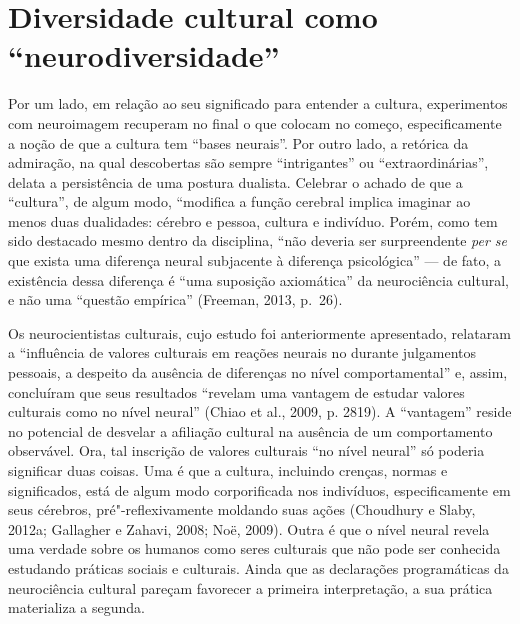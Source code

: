 \chapter{Diversidade cultural como ``neurodiversidade''}

Por um lado, em relação ao seu significado para entender a cultura,
experimentos com neuroimagem recuperam no final o que colocam no começo,
especificamente a noção de que a cultura tem ``bases neurais''. Por
outro lado, a retórica da admiração, na qual descobertas são sempre
``intrigantes'' ou ``extraordinárias'', delata a persistência de uma
postura dualista. Celebrar o achado de que a ``cultura'', de algum modo,
``modifica a função cerebral implica imaginar ao menos duas dualidades:
cérebro e pessoa, cultura e indivíduo. Porém, como tem sido destacado
mesmo dentro da disciplina, ``não deveria ser surpreendente \emph{per
se} que exista uma diferença neural subjacente à diferença psicológica''
--- de fato, a existência dessa diferença é ``uma suposição axiomática''
da neurociência cultural, e não uma ``questão empírica'' (Freeman, 2013,
p.~26).

Os neurocientistas culturais, cujo estudo foi anteriormente apresentado,
relataram a ``influência de valores culturais em reações neurais no 
durante julgamentos pessoais, a despeito da ausência de diferenças no
nível comportamental'' e, assim, concluíram que seus resultados
``revelam uma vantagem de estudar valores culturais como  no nível
neural'' (Chiao et al., 2009, p. 2819). A ``vantagem'' reside no
potencial de desvelar a afiliação cultural na ausência de um
comportamento observável. Ora, tal inscrição de valores culturais ``no
nível neural'' só poderia significar duas coisas. Uma é que a cultura,
incluindo crenças, normas e significados, está de algum modo
corporificada nos indivíduos, especificamente em seus cérebros,
pré"-reflexivamente moldando suas ações (Choudhury e Slaby, 2012a;
Gallagher e Zahavi, 2008; Noë, 2009). Outra é que o nível neural revela
uma verdade sobre os humanos como seres culturais que não pode ser
conhecida estudando práticas sociais e culturais. Ainda que as
declarações programáticas da neurociência cultural pareçam favorecer a
primeira interpretação, a sua prática materializa a segunda.

